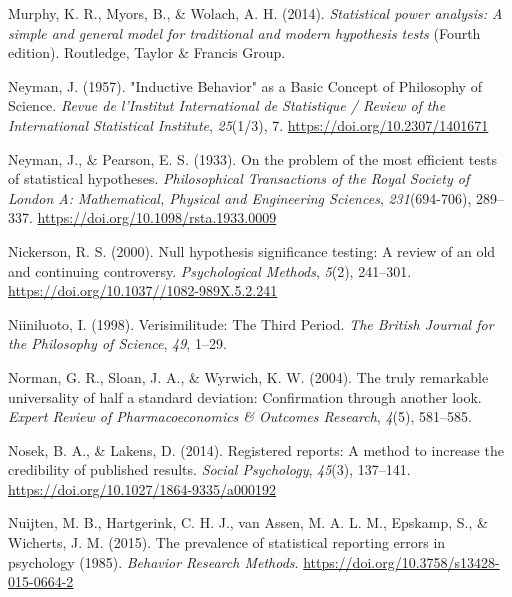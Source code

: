 \documentclass[
  letterpaper,
  DIV=11,
  numbers=noendperiod]{scrreprt}
\newlength{\cslhangindent}
\newlength{\cslentryspacingunit} %
\newenvironment{CSLReferences}[2] %
 {%
  \setlength{\parindent}{0pt}
  \ifodd #1
  \let\oldpar\par
  \def\par{\hangindent=\cslhangindent\oldpar}
  \fi
  \setlength{\parskip}{#2\cslentryspacingunit}
 }%
 {}
\begin{document}
\begin{CSLReferences}{1}{0}
\leavevmode{}%
Murphy, K. R., Myors, B., \& Wolach, A. H. (2014). \emph{Statistical
power analysis: A simple and general model for traditional and modern
hypothesis tests} (Fourth edition). {Routledge, Taylor \& Francis
Group}.

\leavevmode{}%
Neyman, J. (1957). "{Inductive Behavior}" as a {Basic Concept} of
{Philosophy} of {Science}. \emph{Revue de l'Institut International de
Statistique / Review of the International Statistical Institute},
\emph{25}(1/3), 7. \url{https://doi.org/10.2307/1401671}

\leavevmode{}%
Neyman, J., \& Pearson, E. S. (1933). On the problem of the most
efficient tests of statistical hypotheses. \emph{Philosophical
Transactions of the Royal Society of London A: Mathematical, Physical
and Engineering Sciences}, \emph{231}(694-706), 289--337.
\url{https://doi.org/10.1098/rsta.1933.0009}

\leavevmode{}%
Nickerson, R. S. (2000). Null hypothesis significance testing: {A}
review of an old and continuing controversy. \emph{Psychological
Methods}, \emph{5}(2), 241--301.
\url{https://doi.org/10.1037//1082-989X.5.2.241}

\leavevmode{}%
Niiniluoto, I. (1998). Verisimilitude: {The Third Period}. \emph{The
British Journal for the Philosophy of Science}, \emph{49}, 1--29.

\leavevmode{}%
Norman, G. R., Sloan, J. A., \& Wyrwich, K. W. (2004). The truly
remarkable universality of half a standard deviation: Confirmation
through another look. \emph{Expert Review of Pharmacoeconomics \&
Outcomes Research}, \emph{4}(5), 581--585.

\leavevmode{}%
Nosek, B. A., \& Lakens, D. (2014). Registered reports: {A} method to
increase the credibility of published results. \emph{Social Psychology},
\emph{45}(3), 137--141. \url{https://doi.org/10.1027/1864-9335/a000192}

\leavevmode{}%
Nuijten, M. B., Hartgerink, C. H. J., van Assen, M. A. L. M., Epskamp,
S., \& Wicherts, J. M. (2015). The prevalence of statistical reporting
errors in psychology (1985). \emph{Behavior Research
Methods}. \url{https://doi.org/10.3758/s13428-015-0664-2}


\end{CSLReferences}
\end{document}
